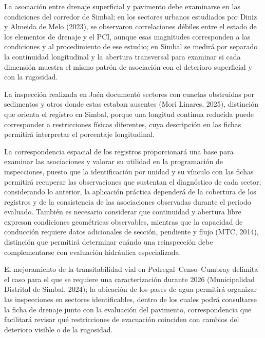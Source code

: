La asociación entre drenaje superficial y pavimento debe examinarse en las condiciones del corredor de Simbal; en los sectores urbanos estudiados por Diniz y Almeida de Melo (2023), se observaron correlaciones débiles entre el estado de los elementos de drenaje y el PCI, aunque esas magnitudes corresponden a las condiciones y al procedimiento de ese estudio; en Simbal se medirá por separado la continuidad longitudinal y la abertura transversal para examinar si cada dimensión muestra el mismo patrón de asociación con el deterioro superficial y con la rugosidad.

La inspección realizada en Jaén documentó sectores con cunetas obstruidas por sedimentos y otros donde estas estaban ausentes (Mori Linares, 2025), distinción que orienta el registro en Simbal, porque una longitud continua reducida puede corresponder a restricciones físicas diferentes, cuya descripción en las fichas permitirá interpretar el porcentaje longitudinal.

La correspondencia espacial de los registros proporcionará una base para examinar las asociaciones y valorar su utilidad en la programación de inspecciones, puesto que la identificación por unidad y su vínculo con las fichas permitirá recuperar las observaciones que sustentan el diagnóstico de cada sector; considerando lo anterior, la aplicación práctica dependerá de la cobertura de los registros y de la consistencia de las asociaciones observadas durante el periodo evaluado. También es necesario considerar que continuidad y abertura libre expresan condiciones geométricas observables, mientras que la capacidad de conducción requiere datos adicionales de sección, pendiente y flujo (MTC, 2014), distinción que permitirá determinar cuándo una reinspección debe complementarse con evaluación hidráulica especializada.


El mejoramiento de la transitabilidad vial en Pedregal–Censo–Cumbray delimita el caso para el que se requiere una caracterización durante 2026 (Municipalidad Distrital de Simbal, 2024); la ubicación de los pases de agua permitirá organizar las inspecciones en sectores identificables, dentro de los cuales podrá consultarse la ficha de drenaje junto con la evaluación del pavimento, correspondencia que facilitará revisar qué restricciones de evacuación coinciden con cambios del deterioro visible o de la rugosidad.

